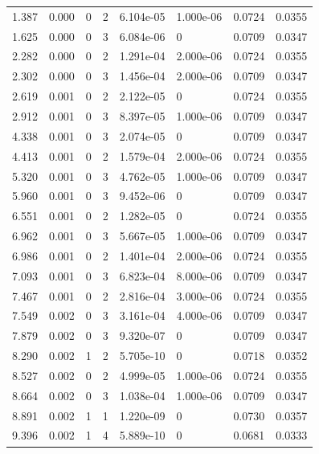 \documentclass[preview]{standalone}
\begin{document}
{{\begin{tabular}{L{1.2cm}C{1.2cm} C{0.3cm}C{0.5cm} C{1.4cm}C{1.4cm} C{1.4cm}C{1.4cm}}
  1.387  &  0.000  & 0     &  2 &  6.104e-05  & 1.000e-06  & 0.0724 &  0.0355   \\ 
  1.625  &  0.000  & 0     &  3 &  6.084e-06  & 0  & 0.0709 &  0.0347   \\ 
  2.282  &  0.000  & 0     &  2 &  1.291e-04  & 2.000e-06  & 0.0724 &  0.0355   \\ 
  2.302  &  0.000  & 0     &  3 &  1.456e-04  & 2.000e-06  & 0.0709 &  0.0347   \\ 
  2.619  &  0.001  & 0     &  2 &  2.122e-05  & 0  & 0.0724 &  0.0355   \\ 
  2.912  &  0.001  & 0     &  3 &  8.397e-05  & 1.000e-06  & 0.0709 &  0.0347   \\ 
  4.338  &  0.001  & 0     &  3 &  2.074e-05  & 0  & 0.0709 &  0.0347   \\ 
  4.413  &  0.001  & 0     &  2 &  1.579e-04  & 2.000e-06  & 0.0724 &  0.0355   \\ 
  5.320  &  0.001  & 0     &  3 &  4.762e-05  & 1.000e-06  & 0.0709 &  0.0347   \\ 
  5.960  &  0.001  & 0     &  3 &  9.452e-06  & 0  & 0.0709 &  0.0347   \\ 
  6.551  &  0.001  & 0     &  2 &  1.282e-05  & 0  & 0.0724 &  0.0355   \\ 
  6.962  &  0.001  & 0     &  3 &  5.667e-05  & 1.000e-06  & 0.0709 &  0.0347   \\ 
  6.986  &  0.001  & 0     &  2 &  1.401e-04  & 2.000e-06  & 0.0724 &  0.0355   \\ 
  7.093  &  0.001  & 0     &  3 &  6.823e-04  & 8.000e-06  & 0.0709 &  0.0347   \\ 
  7.467  &  0.001  & 0     &  2 &  2.816e-04  & 3.000e-06  & 0.0724 &  0.0355   \\ 
  7.549  &  0.002  & 0     &  3 &  3.161e-04  & 4.000e-06  & 0.0709 &  0.0347   \\ 
  7.879  &  0.002  & 0     &  3 &  9.320e-07  & 0  & 0.0709 &  0.0347   \\ 
  8.290  &  0.002  & 1     &  2 &  5.705e-10  & 0  & 0.0718 &  0.0352   \\ 
  8.527  &  0.002  & 0     &  2 &  4.999e-05  & 1.000e-06  & 0.0724 &  0.0355   \\ 
  8.664  &  0.002  & 0     &  3 &  1.038e-04  & 1.000e-06  & 0.0709 &  0.0347   \\ 
  8.891  &  0.002  & 1     &  1 &  1.220e-09  & 0  & 0.0730 &  0.0357   \\ 
  9.396  &  0.002  & 1     &  4 &  5.889e-10  & 0  & 0.0681 &  0.0333   \\ 

\end{tabular}}}
\end{document}
